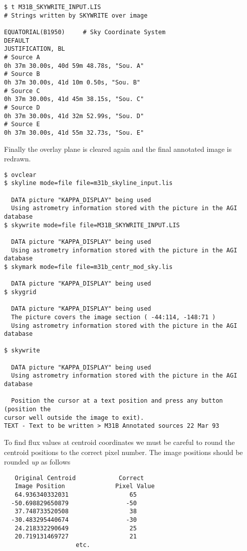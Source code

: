 \begin{small}
\begin{verbatim}
$ t M31B_SKYWRITE_INPUT.LIS
# Strings written by SKYWRITE over image
 
EQUATORIAL(B1950)     # Sky Coordinate System
DEFAULT
JUSTIFICATION, BL
# Source A 
0h 37m 30.00s, 40d 59m 48.78s, "Sou. A"
# Source B
0h 37m 30.00s, 41d 10m 0.50s, "Sou. B"
# Source C
0h 37m 30.00s, 41d 45m 38.15s, "Sou. C"
# Source D
0h 37m 30.00s, 41d 32m 52.99s, "Sou. D"
# Source E
0h 37m 30.00s, 41d 55m 32.73s, "Sou. E"
\end{verbatim}
\end{small}
Finally the overlay plane is cleared again and the final annotated image is
redrawn.
\begin{small}
\begin{verbatim}
$ ovclear
$ skyline mode=file file=m31b_skyline_input.lis

  DATA picture "KAPPA_DISPLAY" being used
  Using astrometry information stored with the picture in the AGI database
$ skywrite mode=file file=M31B_SKYWRITE_INPUT.LIS

  DATA picture "KAPPA_DISPLAY" being used
  Using astrometry information stored with the picture in the AGI database
$ skymark mode=file file=m31b_centr_mod_sky.lis

  DATA picture "KAPPA_DISPLAY" being used
$ skygrid

  DATA picture "KAPPA_DISPLAY" being used
  The picture covers the image section ( -44:114, -148:71 )
  Using astrometry information stored with the picture in the AGI database

$ skywrite

  DATA picture "KAPPA_DISPLAY" being used
  Using astrometry information stored with the picture in the AGI database

  Position the cursor at a text position and press any button (position the
cursor well outside the image to exit).
TEXT - Text to be written > M31B Annotated sources 22 Mar 93
\end{verbatim}
\end{small}

To find flux values at centroid coordinates we must be careful to round the
centroid positions to the correct pixel number. The image positions should be
rounded {\em up} as follows 
\begin{small}
\begin{verbatim}
   Original Centroid            Correct
   Image Position              Pixel Value                      
   64.936340332031                 65
  -50.698829650879                -50
   37.748733520508                 38
  -30.483295440674                -30
   24.218332290649                 25
   20.719131469727                 21
                    etc.
\end{verbatim}
\end{small}

